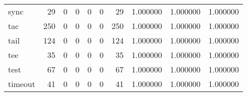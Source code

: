 \begin{tabular}{lrrrrrrrrr}
sync      &                                        29 &                                                  0 &                                                  0 &                                                  0 &                                                  0 &                                                 29 &                                           1.000000 &                               1.000000 &                             1.000000 \\
tac       &                                       250 &                                                  0 &                                                  0 &                                                  0 &                                                  0 &                                                250 &                                           1.000000 &                               1.000000 &                             1.000000 \\
tail      &                                       124 &                                                  0 &                                                  0 &                                                  0 &                                                  0 &                                                124 &                                           1.000000 &                               1.000000 &                             1.000000 \\
tee       &                                        35 &                                                  0 &                                                  0 &                                                  0 &                                                  0 &                                                 35 &                                           1.000000 &                               1.000000 &                             1.000000 \\
test      &                                        67 &                                                  0 &                                                  0 &                                                  0 &                                                  0 &                                                 67 &                                           1.000000 &                               1.000000 &                             1.000000 \\
timeout   &                                        41 &                                                  0 &                                                  0 &                                                  0 &                                                  0 &                                                 41 &                                           1.000000 &                               1.000000 &                             1.000000 \\

\end{tabular}
